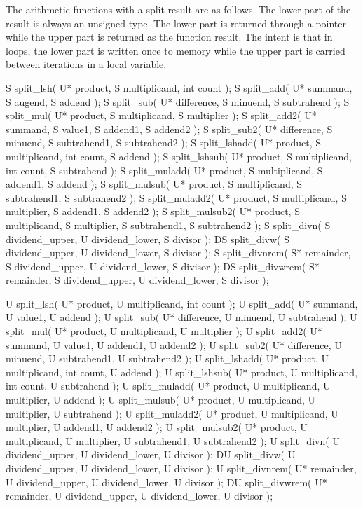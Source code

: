 The arithmetic functions with a split result are as follows. The lower part of the result is always an unsigned type. The lower part is returned through a pointer while the upper part is returned as the function result. The intent is that in loops, the lower part is written once to memory while the upper part is carried between iterations in a local variable.

\begin{itemdecl}
S split_lsh( U* product, S multiplicand, int count );
S split_add( U* summand, S augend, S addend );
S split_sub( U* difference, S minuend, S subtrahend );
S split_mul( U* product, S multiplicand, S multiplier );
S split_add2( U* summand, S value1, S addend1, S addend2 );
S split_sub2( U* difference, S minuend, S subtrahend1, S subtrahend2 );
S split_lshadd( U* product, S multiplicand, int count, S addend );
S split_lshsub( U* product, S multiplicand, int count, S subtrahend );
S split_muladd( U* product, S multiplicand, S addend1, S addend );
S split_mulsub( U* product, S multiplicand, S subtrahend1, S subtrahend2 );
S split_muladd2( U* product, S multiplicand, S multiplier, S addend1, S addend2 );
S split_mulsub2( U* product, S multiplicand, S multiplier, S subtrahend1, S subtrahend2 );
S split_divn( S dividend_upper, U dividend_lower, S divisor );
DS split_divw( S dividend_upper, U dividend_lower, S divisor );
S split_divnrem( S* remainder, S dividend_upper, U dividend_lower, S divisor );
DS split_divwrem( S* remainder, S dividend_upper, U dividend_lower, S divisor );

U split_lsh( U* product, U multiplicand, int count );
U split_add( U* summand, U value1, U addend );
U split_sub( U* difference, U minuend, U subtrahend );
U split_mul( U* product, U multiplicand, U multiplier );
U split_add2( U* summand, U value1, U addend1, U addend2 );
U split_sub2( U* difference, U minuend, U subtrahend1, U subtrahend2 );
U split_lshadd( U* product, U multiplicand, int count, U addend );
U split_lshsub( U* product, U multiplicand, int count, U subtrahend );
U split_muladd( U* product, U multiplicand, U multiplier, U addend );
U split_mulsub( U* product, U multiplicand, U multiplier, U subtrahend );
U split_muladd2( U* product, U multiplicand, U multiplier, U addend1, U addend2 );
U split_mulsub2( U* product, U multiplicand, U multiplier, U subtrahend1, U subtrahend2 );
U split_divn( U dividend_upper, U dividend_lower, U divisor );
DU split_divw( U dividend_upper, U dividend_lower, U divisor );
U split_divnrem( U* remainder, U dividend_upper, U dividend_lower, U divisor );
DU split_divwrem( U* remainder, U dividend_upper, U dividend_lower, U divisor );		
\end{itemdecl}

\begin{itemdescr}
\end{itemdescr}